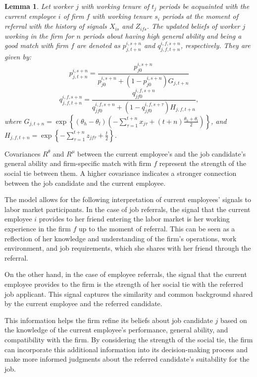 \documentclass[12pt]{article}
\newtheorem{lemma}{Lemma}
\begin{document}
\begin{lemma}\label{lemma:upd_beliefs_R}
    Let worker $j$ with working tenure of $t_j$ periods be acquainted with the current employee $i$ of firm $f$ with working tenure $s_i$ periods at the moment of referral with the history of signals $X_{is}$ and $Z_{ifs}$. The updated beliefs of worker $j$ working in the firm for $n$ periods about having high general ability and being a good match with firm $f$ are denoted as $p_{j,t+n}^{i,s+n}$ and $q_{j,f,t+n}^{i,f,s+n}$, respectively. They are given by:
    \begin{equation}\label{eq:p_jt_is+t}
        p_{j,t+n}^{i,s+n} = \frac{p_{j0}^{i,s+n}}{p_{j0}^{i,s+n} + (1 - p_{j0}^{i,s+n})G_{j,t+n}}
    \end{equation}
    \begin{equation}\label{eq:q_jt_is+t}
        q_{j,f,t+n}^{i,f,s+n} = \frac{q_{jf0}^{i,f,s+n}}{q_{jf0}^{i,f,s+n} + (1- q_{jf0}^{i,f,s+\tau})H_{j,f,t+n}},
    \end{equation}
    where $G_{j,t+n} = \exp \left\lbrace (\theta_h - \theta_l)(-\sum_{\tau = 1}^{t+n}x_{j\tau} + (t+n)\frac{\theta_h + \theta_l}{2}) \right \rbrace$, and $H_{j,f,t+n} = \exp \left\lbrace -\sum_{\tau = 1}^{t+n}z_{jf\tau}+\frac{t}{2}\right\rbrace$.
\end{lemma}

Covariances $R^\theta$ and $R^\mu$ between the current employee's and the job candidate's general ability and firm-specific match with firm $f$ represent the strength of the social tie between them. A higher covariance indicates a stronger connection between the job candidate and the current employee.

The model allows for the following interpretation of current employees' signals to labor market participants. In the case of job referrals, the signal that the current employee $i$ provides to her friend entering the labor market is her working experience in the firm $f$ up to the moment of referral. This can be seen as a reflection of her knowledge and understanding of the firm's operations, work environment, and job requirements, which she shares with her friend through the referral.

On the other hand, in the case of employee referrals, the signal that the current employee provides to the firm is the strength of her social tie with the referred job applicant. This signal captures the similarity and common background shared by the current employee and the referred candidate.

This information helps the firm refine its beliefs about job candidate $j$ based on the knowledge of the current employee's performance, general ability, and compatibility with the firm. By considering the strength of the social tie, the firm can incorporate this additional information into its decision-making process and make more informed judgments about the referred candidate's suitability for the job.
\end{document}
